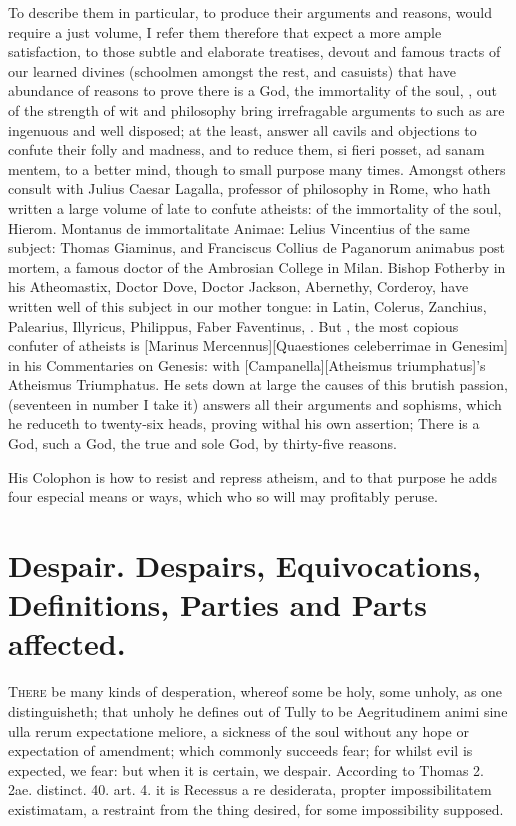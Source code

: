 {To describe them in particular, to produce their arguments and reasons,
would require a just volume, I refer them therefore that expect a more
ample satisfaction, to those subtle and elaborate treatises, devout and
famous tracts of our learned divines (schoolmen amongst the rest, and
casuists) that have abundance of reasons to prove there is a God, the
immortality of the soul, \etc{}, out of the strength of wit and philosophy
bring irrefragable arguments to such as are ingenuous and well
disposed; at the least, answer all cavils and objections to confute
their folly and madness, and to reduce them, si fieri posset, ad sanam
mentem, to a better mind, though to small purpose many times. Amongst
others consult with Julius Caesar Lagalla, professor of philosophy in
Rome, who hath written a large volume of late to confute atheists: of
the immortality of the soul, Hierom. Montanus de immortalitate Animae:
Lelius Vincentius of the same subject: Thomas Giaminus, and Franciscus
Collius de Paganorum animabus post mortem, a famous doctor of the
Ambrosian College in Milan. Bishop Fotherby in his Atheomastix, Doctor
Dove, Doctor Jackson, Abernethy, Corderoy, have written well of this
subject in our mother tongue: in Latin, Colerus, Zanchius, Palearius,
Illyricus, Philippus, Faber Faventinus, \etc{}. But ,
the most copious confuter of atheists is
[Marinus Mercennus][\textlatin{Quaestiones celeberrimae in Genesim}]
in his Commentaries on Genesis: with [Campanella][\textlatin{Atheismus triumphatus}]'s \textlatin{Atheismus Triumphatus}.
He sets down at large the causes of this brutish passion, (seventeen in
number I take it) answers all their arguments and sophisms, which he
reduceth to twenty-six heads, proving withal his own assertion; There
is a God, such a God, the true and sole God, by thirty-five reasons.

His Colophon is how to resist and repress atheism, and to that purpose
he adds four especial means or ways, which who so will may profitably
peruse.

\section[Despair]{Despair. Despairs, Equivocations, Definitions, Parties and Parts affected.}

\lettrine{T}{here} be many kinds of desperation, whereof some be holy, some unholy,
as one distinguisheth; that unholy he defines out of Tully to be
Aegritudinem animi sine ulla rerum expectatione meliore, a sickness of
the soul without any hope or expectation of amendment; which commonly
succeeds fear; for whilst evil is expected, we fear: but when it is
certain, we despair. According to Thomas 2. 2ae. distinct. 40. art. 4.
it is Recessus a re desiderata, propter impossibilitatem existimatam, a
restraint from the thing desired, for some impossibility supposed.

}

